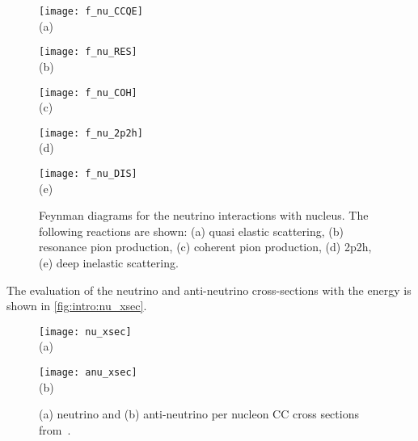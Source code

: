 \documentclass[../main.tex]{subfiles}
\begin{document}
\begin{figure}[!ht]
  \centering
  \begin{minipage}{0.29\linewidth}
    \centering
    \texttt{[image: f\_nu\_CCQE]} \\ (a)
  \end{minipage}
  \begin{minipage}{0.29\linewidth}
    \centering
    \texttt{[image: f\_nu\_RES]} \\ (b)
  \end{minipage}
  \begin{minipage}{0.29\linewidth}
    \centering
    \texttt{[image: f\_nu\_COH]} \\ (c)
  \end{minipage}
  \vfill
  \begin{minipage}{0.29\linewidth}
    \centering
    \texttt{[image: f\_nu\_2p2h]} \\ (d)
  \end{minipage}
  \begin{minipage}{0.29\linewidth}
    \centering
    \texttt{[image: f\_nu\_DIS]} \\ (e)
  \end{minipage}
  \caption{Feynman diagrams for the neutrino interactions with nucleus. The following reactions are shown: (a) quasi elastic scattering, (b) resonance pion production, (c) coherent pion production, (d) 2p2h, (e) deep inelastic scattering.}
  \label{fig:intro:f_nu_nucl}
\end{figure}

The evaluation of the neutrino and anti-neutrino cross-sections with the energy is shown in \autoref{fig:intro:nu_xsec}.

\begin{figure}[!ht]
  \centering
  \begin{minipage}{0.49\linewidth}
    \centering
    \texttt{[image: nu\_xsec]} \\ (a)
  \end{minipage}
  \begin{minipage}{0.49\linewidth}
    \centering
    \texttt{[image: anu\_xsec]} \\ (b)
  \end{minipage}
  \caption{(a) neutrino and (b) anti-neutrino per nucleon CC cross sections from~\cite{Formaggio2012}.}

  \label{fig:intro:nu_xsec}
\end{figure}
\end{document}
